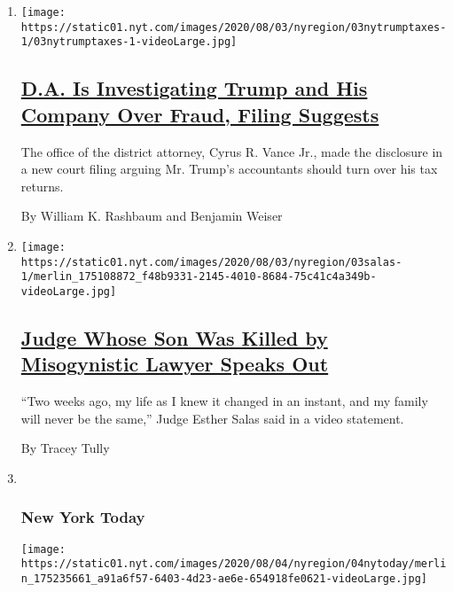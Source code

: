 \begin{enumerate}
\def\labelenumi{\arabic{enumi}.}
\item
  \texttt{[image: https://static01.nyt.com/images/2020/08/03/nyregion/03nytrumptaxes-1/03nytrumptaxes-1-videoLarge.jpg]}

  \hypertarget{da-is-investigating-trump-and-his-company-over-fraud-filing-suggests}{%
  \subsection{\texorpdfstring{\href{/2020/08/03/nyregion/donald-trump-taxes-cyrus-vance.html}{D.A.
  Is Investigating Trump and His Company Over Fraud, Filing
  Suggests}}{D.A. Is Investigating Trump and His Company Over Fraud, Filing Suggests}}\label{da-is-investigating-trump-and-his-company-over-fraud-filing-suggests}}

  The office of the district attorney, Cyrus R. Vance Jr., made the
  disclosure in a new court filing arguing Mr. Trump's accountants
  should turn over his tax returns.

  By William K. Rashbaum and Benjamin Weiser
\item
  \texttt{[image: https://static01.nyt.com/images/2020/08/03/nyregion/03salas-1/merlin\_175108872\_f48b9331-2145-4010-8684-75c41c4a349b-videoLarge.jpg]}

  \hypertarget{judge-whose-son-was-killed-by-misogynistic-lawyer-speaks-out}{%
  \subsection{\texorpdfstring{\href{/2020/08/03/nyregion/esther-salas-roy-den-hollander.html}{Judge
  Whose Son Was Killed by Misogynistic Lawyer Speaks
  Out}}{Judge Whose Son Was Killed by Misogynistic Lawyer Speaks Out}}\label{judge-whose-son-was-killed-by-misogynistic-lawyer-speaks-out}}

  ``Two weeks ago, my life as I knew it changed in an instant, and my
  family will never be the same,'' Judge Esther Salas said in a video
  statement.

  By Tracey Tully
\item ~
  \hypertarget{new-york-today}{%
  \subsubsection{New York Today}\label{new-york-today}}

  \texttt{[image: https://static01.nyt.com/images/2020/08/04/nyregion/04nytoday/merlin\_175235661\_a91a6f57-6403-4d23-ae6e-654918fe0621-videoLarge.jpg]}


\end{enumerate}
